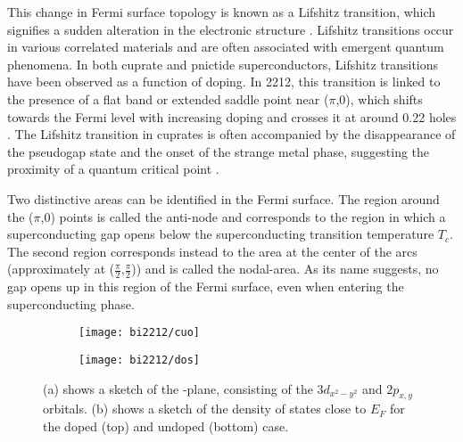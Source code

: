 This change in Fermi surface topology is known as a Lifshitz transition, which signifies a sudden alteration in the electronic structure \cite{lifshitz_anomalies_1960}.
Lifshitz transitions occur in various correlated materials and are often associated with emergent quantum phenomena.
In both cuprate and pnictide superconductors, Lifshitz transitions have been observed as a function of doping.
In 2212, this transition is linked to the presence of a flat band or extended saddle point near ($\pi$,$0$), which shifts towards the Fermi level with increasing doping and crosses it at around 0.22 holes \cite{campuzano_photoemission_2004, gofron_observation_1994}.
The Lifshitz transition in cuprates is often accompanied by the disappearance of the pseudogap state \cite{matt_electron_2015, benhabib_collapse_2015} and the onset of the strange metal phase, suggesting the proximity of a quantum critical point \cite{michon_thermodynamic_2019, chen_incoherent_2019, cooper_anomalous_2009, badoux_change_2016, putzke_reduced_2021}.

Two distinctive areas can be identified in the Fermi surface.
The region around the ($\pi$,$0$) points is called the anti-node and corresponds to the region in which a superconducting gap opens below the superconducting transition temperature $T_c$.
The second region corresponds instead to the area at the center of the arcs (approximately at ($\frac{\pi}{2}$,$\frac{\pi}{2}$)) and is called the nodal-area.
As its name suggests, no gap opens up in this region of the Fermi surface, even when entering the superconducting phase.

\begin{figure}[t]
	\centering
	\begin{subfigure}[b]{0.49\textwidth}
		\texttt{[image: bi2212/cuo]}
		\caption{}
	\end{subfigure}
	\begin{subfigure}[b]{0.45\textwidth}
		\texttt{[image: bi2212/dos]}
		\caption{}
	\end{subfigure}
	\caption{(a) shows a sketch of the -plane, consisting of the  $3d_{x^2-y^2}$ and  $2p_{x,y}$ orbitals. (b) shows a sketch of the density of states close to $E_F$ for the doped (top) and undoped (bottom) case.}
	\label{fig:cuo_dos}
\end{figure}

